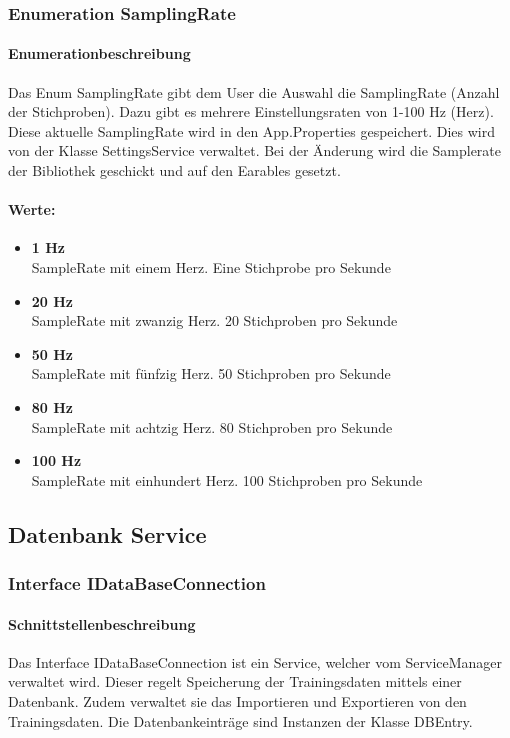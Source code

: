 \documentclass[a4paper,12pt]{article}
\begin{document}
\subsubsection{Enumeration SamplingRate}
	\paragraph{Enumerationbeschreibung}
	Das Enum SamplingRate gibt dem User die Auswahl die SamplingRate (Anzahl der Stichproben). Dazu gibt es mehrere Einstellungsraten von 1-100 Hz (Herz). Diese aktuelle SamplingRate wird in den App.Properties gespeichert. Dies wird von der Klasse SettingsService verwaltet. 
	Bei der Änderung wird die Samplerate der Bibliothek geschickt und auf den \Gls{Earables} gesetzt.
	
	\paragraph{Werte:}
	\begin{itemize}
		\item \textbf{1 Hz}\\SampleRate mit einem Herz. Eine Stichprobe pro Sekunde
		\item \textbf{20 Hz}\\SampleRate mit zwanzig Herz. 20 Stichproben pro Sekunde
		\item \textbf{50 Hz}\\SampleRate mit fünfzig Herz. 50 Stichproben pro Sekunde
		\item \textbf{80 Hz}\\SampleRate mit achtzig Herz. 80 Stichproben pro Sekunde
		\item \textbf{100 Hz}\\SampleRate mit einhundert Herz. 100 Stichproben pro Sekunde
	\end{itemize}
	
	
	
	
	
	
	
\subsection{Datenbank Service}
\subsubsection{Interface IDataBaseConnection}
	\paragraph{Schnittstellenbeschreibung}
	Das Interface IDataBaseConnection ist ein Service, welcher vom ServiceManager verwaltet wird. Dieser regelt Speicherung der Trainingsdaten mittels einer \gls{Datenbank}. Zudem verwaltet sie das Importieren und Exportieren von den Trainingsdaten.
	Die Datenbankeinträge sind Instanzen der Klasse DBEntry. 
	
\end{document}

